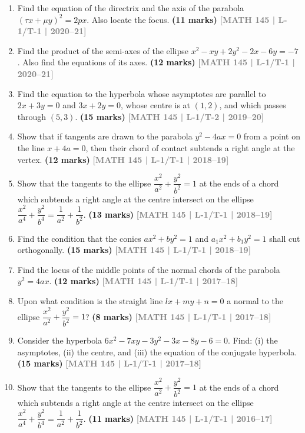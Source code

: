 \documentclass[12pt,a4paper]{article}
\newcommand{\yr}[1]{\hfill\textcolor{gray}{\small\textbf{[#1]}}}
\newcommand{\mk}[1]{\textcolor{orange!70!black}{\small\textbf{(#1 marks)}}}
\begin{document}
\begin{enumerate}\item Find the equation of the directrix and the axis of the parabola $(\tau x+\mu y)^{2}=2px$. Also locate the focus.
\mk{11} \yr{MATH 145 | L-1/T-1 | 2020--21}

\item Find the product of the semi-axes of the ellipse $x^{2}-xy+2y^{2}-2x-6y=-7$. Also find the equations of its axes.
\mk{12} \yr{MATH 145 | L-1/T-1 | 2020--21}

\item Find the equation to the hyperbola whose asymptotes are parallel to $2x+3y=0$ and $3x+2y=0$, whose centre is at $(1,2)$, and which passes through $(5,3)$.
\mk{15} \yr{MATH 145 | L-1/T-2 | 2019--20}

\item Show that if tangents are drawn to the parabola $y^{2}-4ax=0$ from a point on the line $x+4a=0$, then their chord of contact subtends a right angle at the vertex.
\mk{12} \yr{MATH 145 | L-1/T-1 | 2018--19}

\item Show that the tangents to the ellipse $\dfrac{x^{2}}{a^{2}}+\dfrac{y^{2}}{b^{2}}=1$ at the ends of a chord which subtends a right angle at the centre intersect on the ellipse $\dfrac{x^{2}}{a^{4}}+\dfrac{y^{2}}{b^{4}}=\dfrac{1}{a^{2}}+\dfrac{1}{b^{2}}$.
\mk{13} \yr{MATH 145 | L-1/T-1 | 2018--19}

\item Find the condition that the conics $ax^{2}+by^{2}=1$ and $a_{1}x^{2}+b_{1}y^{2}=1$ shall cut orthogonally.
\mk{15} \yr{MATH 145 | L-1/T-1 | 2018--19}



\item Find the locus of the middle points of the normal chords of the parabola $y^{2}=4ax$.
\mk{12} \yr{MATH 145 | L-1/T-1 | 2017--18}

\item Upon what condition is the straight line $lx+my+n=0$ a normal to the ellipse $\dfrac{x^{2}}{a^{2}}+\dfrac{y^{2}}{b^{2}}=1$?
\mk{8} \yr{MATH 145 | L-1/T-1 | 2017--18}

\item Consider the hyperbola $6x^{2}-7xy-3y^{2}-3x-8y-6=0$. Find: (i) the asymptotes, (ii) the centre, and (iii) the equation of the conjugate hyperbola.
\mk{15} \yr{MATH 145 | L-1/T-1 | 2017--18}

\item Show that the tangents to the ellipse $\dfrac{x^{2}}{a^{2}}+\dfrac{y^{2}}{b^{2}}=1$ at the ends of a chord which subtends a right angle at the centre intersect on the ellipse $\dfrac{x^{2}}{a^{4}}+\dfrac{y^{2}}{b^{4}}=\dfrac{1}{a^{2}}+\dfrac{1}{b^{2}}$.
\mk{11} \yr{MATH 145 | L-1/T-1 | 2016--17}


\end{enumerate}
\end{document}
